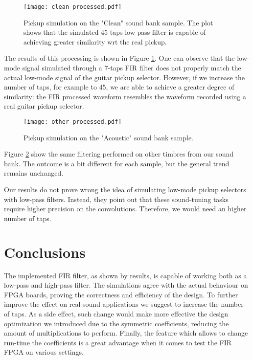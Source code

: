 \begin{figure}[H]
    \centering
    \caption{Pickup simulation on the "Clean" sound bank sample. The plot shows that the simulated 45-taps low-pass filter is capable of achieving greater similarity wrt the real pickup.}
    \label{fig:clean_processed}
    \texttt{[image: clean\_processed.pdf]}
\end{figure}

The results of this processing is shown in Figure \ref{fig:clean_processed}. One can observe that the low-mode signal simulated through a 7-taps FIR filter does not properly match the actual low-mode signal of the guitar pickup selector. However, if we increase the number of taps, for example to 45, we are able to achieve a greater degree of similarity: the FIR processed waveform resembles the waveform recorded using a real guitar pickup selector.


\begin{figure}[H]
    \centering
    \caption{Pickup simulation on the "Acoustic" sound bank sample.}
    \label{fig:other_processed}
    \texttt{[image: other\_processed.pdf]}
\end{figure}

Figure \ref{fig:other_processed} show the same filtering performed on other timbres from our sound bank. The outcome is a bit different for each sample, but the general trend remains unchanged.



Our results do not prove wrong the idea of simulating low-mode pickup selectors with low-pass filters. Instead, they point out that these sound-tuning tasks require higher precision on the convolutions. Therefore, we would need an higher number of taps.


\section{Conclusions}
\label{sec:conclusions}

The implemented FIR filter, as shown by results, is capable of working both as a low-pass and high-pass filter. The simulations agree with the actual behaviour on FPGA boards, proving the correctness and efficiency of the design. To further improve the effect on real sound applications we suggest to increase the number of taps. As a side effect, such change would make more effective the design optimization we introduced due to the symmetric coefficients, reducing the amount of multiplications to perform. Finally, the feature which allows to change run-time the coefficients is a great advantage when it comes to test the FIR FPGA on various settings.